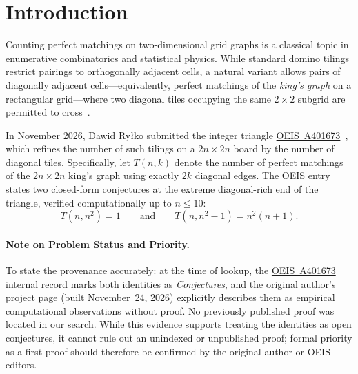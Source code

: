 \documentclass[11pt,a4paper]{article}
\theoremstyle{paperthm}
\theoremstyle{paperdef}
\begin{document}
\section{Introduction}

Counting perfect matchings on two-dimensional grid graphs is a classical topic in enumerative combinatorics and statistical physics. While standard domino tilings restrict pairings to orthogonally adjacent cells, a natural variant allows pairs of diagonally adjacent cells---equivalently, perfect matchings of the \emph{king's graph} on a rectangular grid---where two diagonal tiles occupying the same $2 \times 2$ subgrid are permitted to cross~\cite{oeisA239264}.

In November 2026, Dawid Ry\l ko submitted the integer triangle \href{https://oeis.org/A401673}{OEIS~A401673}~\cite{oeisA401673}, which refines the number of such tilings on a $2n \times 2n$ board by the number of diagonal tiles. Specifically, let $T(n,k)$ denote the number of perfect matchings of the $2n \times 2n$ king's graph using exactly $2k$ diagonal edges. The OEIS entry states two closed-form conjectures at the extreme diagonal-rich end of the triangle, verified computationally up to $n \le 10$:
\[
  T(n, n^2) = 1 \qquad\text{and}\qquad T(n, n^2 - 1) = n^2(n+1).
\]

\paragraph{Note on Problem Status and Priority.}
To state the provenance accurately: at the time of lookup, the \href{https://oeis.org/A401673/internal}{OEIS~A401673 internal record} marks both identities as \emph{Conjectures}, and the original author's project page (built November~24, 2026) explicitly describes them as empirical computational observations without proof. No previously published proof was located in our search. While this evidence supports treating the identities as open conjectures, it cannot rule out an unindexed or unpublished proof; formal priority as a first proof should therefore be confirmed by the original author or OEIS editors.
\end{document}
